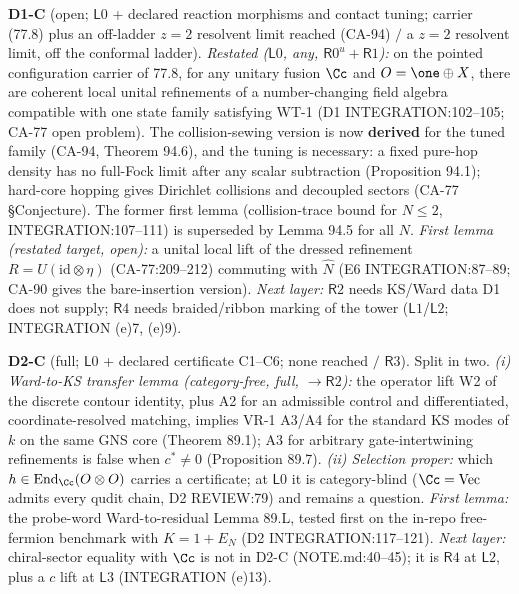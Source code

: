 \textbf{D1-C} (open; \(\mathsf L0\) + declared reaction morphisms and contact tuning; carrier (77.8) plus an off-ladder
\(z{=}2\) resolvent limit reached (CA-94) \(/\) a \(z=2\) resolvent limit, off the conformal ladder).  \emph{Restated (\(\mathsf L0\), any, \(\mathsf R0^u+\mathsf R1\)):}
on the pointed configuration carrier of 77.8, for any unitary fusion \(\Cc\) and \(O=\one\oplus X\), there are coherent
local unital refinements of a number-changing field algebra compatible with one state family satisfying WT-1
(D1 INTEGRATION:102--105; CA-77 open problem).  The collision-sewing version is now \textbf{derived} for the tuned family
(CA-94, Theorem 94.6), and the tuning is necessary: a fixed pure-hop density has no full-Fock limit after any scalar
subtraction (Proposition 94.1); hard-core hopping gives Dirichlet collisions and decoupled sectors (CA-77 \S Conjecture).
The former first lemma (collision-trace bound for \(N\le2\), INTEGRATION:107--111) is superseded by Lemma 94.5 for all \(N\).
\emph{First lemma (restated target, open):} a unital local lift of the dressed refinement \(R=U(\mathrm{id}\otimes\eta)\)
(CA-77:209--212) commuting with \(\hat N\) (E6 INTEGRATION:87--89; CA-90 gives the bare-insertion version).  \emph{Next layer:} \(\mathsf R2\) needs KS/Ward data D1
does not supply; \(\mathsf R4\) needs braided/ribbon marking of the tower (\(\mathsf L1\)/\(\mathsf L2\); INTEGRATION (e)7, (e)9).

\textbf{D2-C} (full; \(\mathsf L0\) + declared certificate C1--C6; none reached \(/\) \(\mathsf R3\)).  Split in two.
\emph{(i) Ward-to-KS transfer lemma (category-free, full, \(\to\mathsf R2\)):} the operator lift W2 of the discrete contour
identity, plus A2 for an admissible control and differentiated, coordinate-resolved matching, implies VR-1 A3/A4 for
the standard KS modes of \(k\) on the same GNS core (Theorem 89.1); A3 for arbitrary gate-intertwining refinements is
false when \(c^*\neq0\) (Proposition 89.7).  \emph{(ii) Selection proper:} which \(h\in\operatorname{End}_\Cc(O\otimes O)\) carries a certificate; at
\(\mathsf L0\) it is category-blind (\(\Cc=\mathrm{Vec}\) admits every qudit chain, D2 REVIEW:79) and remains a question.
\emph{First lemma:} the probe-word Ward-to-residual Lemma 89.L, tested first on the in-repo free-fermion benchmark with
\(K=1+E_N\) (D2 INTEGRATION:117--121).
\emph{Next layer:} chiral-sector equality with \(\Cc\) is not in D2-C (NOTE.md:40--45); it is \(\mathsf R4\) at
\(\mathsf L2\), plus a \(c\) lift at \(\mathsf L3\) (INTEGRATION (e)13).

